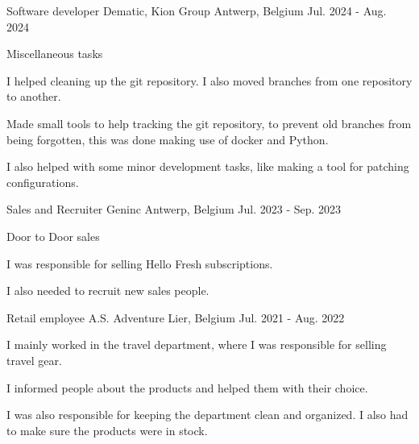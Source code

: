 

\begin{cventries}

  \cventry
    {Software developer} %
    {Dematic, Kion Group} %
    {Antwerp, Belgium} %
    {Jul. 2024 - Aug. 2024} %
    {
      \begin{cvitems} %
        \item {Miscellaneous tasks}
        \item {I helped cleaning up the git repository. I also moved branches from one repository to another.}
        \item {Made small tools to help tracking the git repository, to prevent old branches from being forgotten, this was done making use of docker and Python.}
        \item {I also helped with some minor development tasks, like making a tool for patching configurations.}
      \end{cvitems}
    }

  \cventry
    {Sales and Recruiter} %
    {Geninc} %
    {Antwerp, Belgium} %
    {Jul. 2023 - Sep. 2023} %
    {
      \begin{cvitems} %
        \item {Door to Door sales}
        \item {I was responsible for selling Hello Fresh subscriptions.}
        \item {I also needed to recruit new sales people.}
      \end{cvitems}
    }
    
  \cventry
    {Retail employee} %
    {A.S. Adventure} %
    {Lier, Belgium} %
    {Jul. 2021 - Aug. 2022} %
    {
      \begin{cvitems} %
        \item {I mainly worked in the travel department, where I was responsible for selling travel gear.}
        \item {I informed people about the products and helped them with their choice.}
        \item {I was also responsible for keeping the department clean and organized. I also had to make sure the products were in stock.} 
      \end{cvitems}
    }


\end{cventries}
